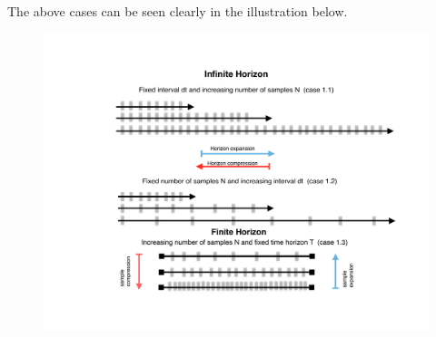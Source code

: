 \documentclass[aspectratio=169]{beamer}\usepackage[utf8]{inputenc}
\begin{document}
\begin{frame}%
The above cases can be seen clearly in the illustration below.
\begin{figure}
  \includegraphics[scale=0.4]{Figures/data_horizons.pdf}
\end{figure}
\end{frame}





\end{document}

